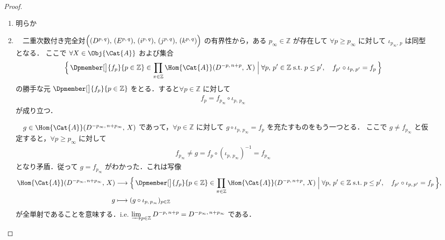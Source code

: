 \documentclass[algtopo_main]{subfiles}
\begin{document}
\begin{proof}
    \begin{enumerate}
        \item 明らか
        \item 　二重次数付き完全対$\Bigl( (D^{p,\, q}),\, (E^{p,\, q}),\, (i^{p,\, q}),\, (j^{p,\, q}),\, (k^{p,\, q}) \Bigr)$ の有界性から，ある $p_\infty \in \mathbb{Z}$ が存在して $\forall p \ge p_\infty$ に対して $\iota_{p_\infty,\, p}$ は同型となる．
        ここで $\forall X \in \Obj{\Cat{A}}$ および集合
            \begin{align}
                \Bigl\{\, \Dpmember[\big]{f_p}{p \in \mathbb{Z}} \in \prod_{\pi \in \mathbb{Z}} \Hom{\Cat{A}}(D^{-p,\, n+p},\, X)\Bigm| \forall p,\, p' \in \mathbb{Z}\; \text{s.t.} \; p \le p', \quad f_{p'} \circ \iota_{p,\, p'} = f_p \,\Bigr\} 
            \end{align}
        の勝手な元 $\Dpmember[\big]{f_p}{p \in \mathbb{Z}}$ をとる．すると$\forall p \in \mathbb{Z}$ に対して
        \begin{align}
            f_p = f_{p_\infty} \circ \iota_{p,\, p_\infty}
        \end{align}
        が成り立つ．

        　$g \in \Hom{\Cat{A}}(D^{-p_\infty,\, n+p_\infty},\, X)$ であって，$\forall p \in \mathbb{Z}$ に対して $g \circ \iota_{p,\, p_\infty} = f_p$ を充たすものをもう一つとる．
        ここで $g \neq f_{p_\infty}$ と仮定すると，$\forall p \ge p_\infty$ に対して
        \begin{align}
            f_{p_\infty} \neq g = f_p \circ (\iota_{p,\, p_\infty})^{-1} = f_{p_\infty}
        \end{align}
        となり矛盾．従って $g = f_{p_\infty}$ がわかった．これは写像
        \begin{align}
            \Hom{\Cat{A}}(D^{-p_\infty,\, n+p_\infty},\, X) &\lto \Bigl\{\, \Dpmember[\big]{f_p}{p \in \mathbb{Z}} \in \prod_{\pi \in \mathbb{Z}} \Hom{\Cat{A}}(D^{-p,\, n+p},\, X)\Bigm| \forall p,\, p' \in \mathbb{Z}\; \text{s.t.} \; p \le p', \quad f_{p'} \circ \iota_{p,\, p'} = f_p \,\Bigr\}, \\
            g &\lmto (g \circ \iota_{p,\, p_{\infty}})_{p \in \mathbb{Z}}
        \end{align}
        が全単射であることを意味する．i.e. $\varinjlim_{p \in \mathbb{Z}} D^{-p,\, n+p} = D^{-p_\infty,\, n+p_\infty}$ である．
    \end{enumerate}
\end{proof}
\end{document}
